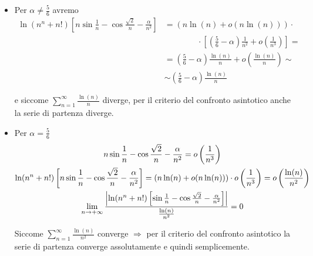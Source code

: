 \begin{exbar}
\begin{example}
	\begin{itemize}
	\item Per $\alpha \neq \frac{5}{6}$ avremo
	\begin{align*}
		\ln(n^n + n!) \left[ n \sin{\frac{1} {n}} - \cos{\frac{\sqrt{2}} {n}} - \frac{\alpha} {n^2} \right] 
		&= \left( n\ln(n) + o(n\ln(n)) \right) \cdot 
		\\ & \qquad\qquad \cdot \left[ \left(\frac{5} {6} - \alpha \right) \frac{1} {n^2} + o \left( \frac{1} {n^3} \right) \right] =
		\\
		&= \left( \frac{5}{6} - \alpha \right)  \frac{\ln(n)}{n} + o \left( \frac{\ln(n)}{n} \right) \sim
		\\
		&\sim \left(\frac{5} {6} - \alpha \right) \frac{\ln(n)} {n}
	\end{align*}
	
	e siccome $\sum_{n=1}^{\infty} \frac{\ln(n)}{n}$ diverge, per il criterio del confronto asintotico anche la serie di partenza diverge.
	
	\item Per $\alpha= \frac{5}{6}$
	\begin{gather*}
		n \sin{\frac{1} {n}} - \cos{\frac{\sqrt{2}} {n}} - \frac{\alpha} {n^2} = o \left( \frac{1} {n^3} \right)
		\\
		\ln(n^n + n!) \left[ n \sin{\frac{1} {n}} - \cos{\frac{\sqrt{2}} {n}} - \frac{\alpha} {n^2} \right] = (n\ln(n) + o(n\ln(n))) \cdot o \left( \frac{1} {n^3} \right) = o \left( \frac{\ln(n)} {n^2} \right)
		\\
		\lim_{n \rightarrow +\infty} \frac{ \left| \ln(n^n + n!) \left[ \sin{\frac{1} {n}} - \cos{\frac{\sqrt{2}} {n}} - \frac{\alpha} {n^2} \right] \right|} {\frac{\ln(n)} {n^2}} = 0
	\end{gather*}
	
	Siccome $\sum_{n=1}^{\infty} \frac{\ln(n)}{n^2}$ converge $\Rightarrow$ per il criterio del confronto asintotico la serie di partenza converge assolutamente e quindi semplicemente.
	\end{itemize}
\end{example}
\end{exbar}



